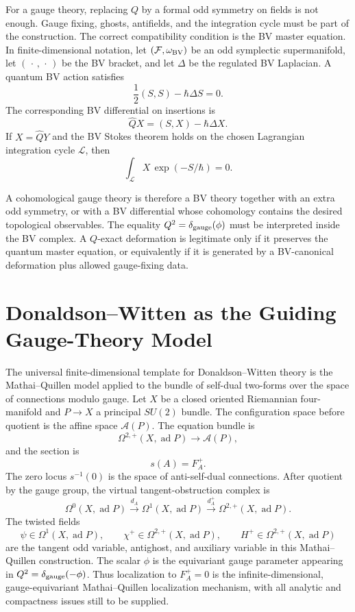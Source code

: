 For a gauge theory, replacing \(Q\) by a formal odd symmetry on fields is not
enough.  Gauge fixing, ghosts, antifields, and the integration cycle must be
part of the construction.  The correct compatibility condition is the BV
master equation.  In finite-dimensional notation, let
\((\mathcal F,\omega_{\rm BV})\) be an odd symplectic supermanifold, let
\((\,\cdot\,,\,\cdot\,)\) be the BV bracket, and let \(\Delta\) be the
regulated BV Laplacian.  A quantum BV action satisfies
\begin{equation}
  \frac12(S,S)-\hbar\Delta S=0.
  \label{eq:cohomological-qme}
\end{equation}
The corresponding BV differential on insertions is
\begin{equation}
  \widehat Q X=(S,X)-\hbar\Delta X.
  \label{eq:bv-quantum-differential}
\end{equation}
If \(X=\widehat QY\) and the BV Stokes theorem holds on the chosen
Lagrangian integration cycle \(\mathcal L\), then
\[
  \int_{\mathcal L}X\,\exp(-S/\hbar)=0.
\]

A cohomological gauge theory is therefore a BV theory together with an extra
odd symmetry, or with a BV differential whose cohomology contains the desired
topological observables.  The equality \(Q^2=\delta_{\rm gauge}(\phi)\) must
be interpreted inside the BV complex.  A \(Q\)-exact deformation is
legitimate only if it preserves the quantum master equation, or equivalently
if it is generated by a BV-canonical deformation plus allowed gauge-fixing
data.

\section{Donaldson--Witten as the Guiding Gauge-Theory Model}

The universal finite-dimensional template for Donaldson--Witten theory is
the Mathai--Quillen model applied to the bundle of self-dual two-forms over
the space of connections modulo gauge.  Let \(X\) be a closed oriented
Riemannian four-manifold and \(P\to X\) a principal \(SU(2)\) bundle.  The
configuration space before quotient is the affine space \(\mathcal A(P)\).
The equation bundle is
\[
  \Omega^{2,+}(X,\operatorname{ad}P)\longrightarrow \mathcal A(P),
\]
and the section is
\[
  s(A)=F_A^+ .
\]
The zero locus \(s^{-1}(0)\) is the space of anti-self-dual connections.
After quotient by the gauge group, the virtual tangent-obstruction complex is
\[
  \Omega^0(X,\operatorname{ad}P)
  \xrightarrow{d_A}
  \Omega^1(X,\operatorname{ad}P)
  \xrightarrow{d_A^+}
  \Omega^{2,+}(X,\operatorname{ad}P).
\]
The twisted fields
\[
  \psi\in\Omega^1(X,\operatorname{ad}P),
  \qquad
  \chi^+\in\Omega^{2,+}(X,\operatorname{ad}P),
  \qquad
  H^+\in\Omega^{2,+}(X,\operatorname{ad}P)
\]
are the tangent odd variable, antighost, and auxiliary variable in this
Mathai--Quillen construction.  The scalar \(\phi\) is the equivariant gauge
parameter appearing in \(Q^2=\delta_{\rm gauge}(-\phi)\).  Thus localization
to \(F_A^+=0\) is the infinite-dimensional, gauge-equivariant
Mathai--Quillen localization mechanism, with all analytic and compactness
issues still to be supplied.

